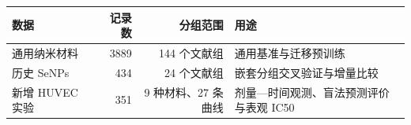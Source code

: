 \begin{tabularx}{\linewidth}{lrrX}
\toprule
数据 & 记录数 & 分组范围 & 用途 \\
\midrule
通用纳米材料 & 3889 & 144 个文献组 & 通用基准与迁移预训练 \\
历史 SeNPs & 434 & 24 个文献组 & 嵌套分组交叉验证与增量比较 \\
新增 HUVEC 实验 & 351 & 9 种材料、27 条曲线 & 剂量—时间观测、盲法预测评价与表观 IC50 \\
\bottomrule
\end{tabularx}
